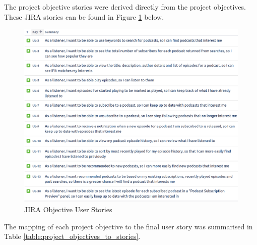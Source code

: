 \documentclass[12pt]{article}
\begin{document}
The project objective stories were derived directly from the project objectives. These JIRA stories can be found in Figure \ref{fig:jira_stories} below.

\begin{figure}[ht]
    \centering
    \includegraphics[width=\textwidth]{resources/objective_stories}
    \caption{JIRA Objective User Stories}
    \label{fig:jira_stories}
\end{figure}

The mapping of each project objective to the final user story was summarised in Table \ref{table:project_objectives_to_stories}.
\end{document}
